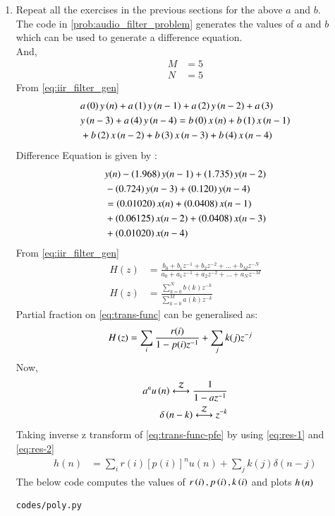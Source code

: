 \documentclass[journal,12pt,twocolumn]{IEEEtran}
\theoremstyle{remark}
\begin{document}
\begin{enumerate}[label=\thesection.\arabic*]
\item Repeat all the exercises in the previous sections for the above $a$ and $b$.\\
\solution The code in \ref{prob:audio_filter_problem} generates the values of $a$ and $b$  which can be used to generate a difference equation.\\
And,
\begin{align}
    M &= 5\\
    N&=5
\end{align}
From \ref{eq:iir_filter_gen} 
\begin{align}
    &a\left(0\right)y\left(n\right) + a\left(1\right)y\left(n-1\right)+a\left(2\right)y\left(n-2\right)+a\left(3\right)\\ \notag &y\left(n-3\right) + a\left(4\right)y\left(n-4\right) =   b\left(0\right)x\left(n\right) + b\left(1\right)x\left(n-1\right)\\ \notag &+b\left(2\right)x\left(n-2\right)+b\left(3\right)x\left(n-3\right) + b\left(4\right)x\left(n-4\right) 
\end{align}
Difference Equation is given by :
\begin{align}
	&y(n) - \left(1.968\right)y(n - 1) + \left(1.735\right)y(n - 2) \nonumber \\
	&- \left(0.724\right)y(n - 3) + \left(0.120\right)y(n - 4) \nonumber \\
	&= \left(0.01020\right)x(n) + \left(0.0408\right)x(n - 1) \nonumber \\
	&+ \left(0.06125\right)x(n - 2) + \left(0.0408\right)x(n - 3) \nonumber \\
	&+ \left(0.01020\right)x(n - 4)
\end{align}
From \eqref{eq:iir_filter_gen} 
\begin{align}
    H(z) &= \frac{b_0 + b_1 z^{-1} + b_2 z^{-2} + \ldots + b_M z^{-N}}{a_0 + a_1 z^{-1} + a_2 z^{-2} + \ldots + a_N z^{-M}}\\
    H(z) &= \frac{\sum_{k = 0}^{N}b(k)z^{-k}}{\sum_{k = 0}^{M}a(k)z^{-k}} \label{eq:trans-func}
\end{align}
Partial fraction on \eqref{eq:trans-func} can be generalised as:
\begin{align}
    H\left(z\right)&= \sum_{i}\frac{r(i)}{1 - p(i)z^{-1}} + \sum_{j}k(j)z^{-j}
	\label{eq:trans-func-pfe}
\end{align}
Now,
\begin{align}
    a^{n}u\brak{n} \system{Z} \frac{1}{1-az^{-1}} \label{eq:res-1}\\
    \delta\brak{n-k} \system{Z} z^{-k}\label{eq:res-2}
\end{align}
Taking inverse z transform of \eqref{eq:trans-func-pfe} by using \eqref{eq:res-1} and \eqref{eq:res-2}
\begin{align}
h(n) &= \sum_{i}r(i)[p(i)]^nu(n) + \sum_{j}k(j)\delta(n - j)
	\label{eq:h-n-expr}
\end{align}
The below code computes the values of $r\left(i\right),p\left(i\right) , k\left(i\right)$ and plots $h\left(n\right)$
\begin{lstlisting}
codes/poly.py
\end{lstlisting}



\end{enumerate}
\end{document}
